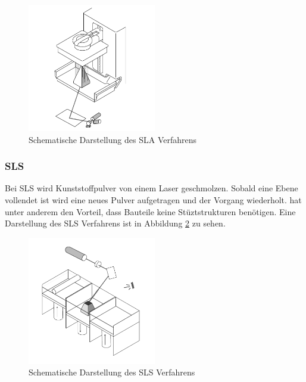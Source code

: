 \begin{figure}[H]
    \centering
    \includegraphics[width=0.5\textwidth]{images/sla.png}
    \caption{Schematische Darstellung des \ac{SLA} Verfahrens }
    \label{fig:sla}
\end{figure}

\subsubsection{\ac{SLS}}

Bei \ac{SLS} wird Kunststoffpulver von einem Laser geschmolzen. Sobald eine Ebene vollendet ist wird eine neues Pulver aufgetragen und der Vorgang wiederholt.  hat unter anderem den Vorteil, dass Bauteile keine Stüztstrukturen benötigen. Eine Darstellung des \ac{SLS} Verfahrens ist in Abbildung \ref{fig:sls} zu sehen.\\

\begin{figure}[H]
    \centering
    \includegraphics[width=0.5\textwidth]{images/sls.png}
    \caption{Schematische Darstellung des \ac{SLS} Verfahrens }
    \label{fig:sls}
\end{figure}